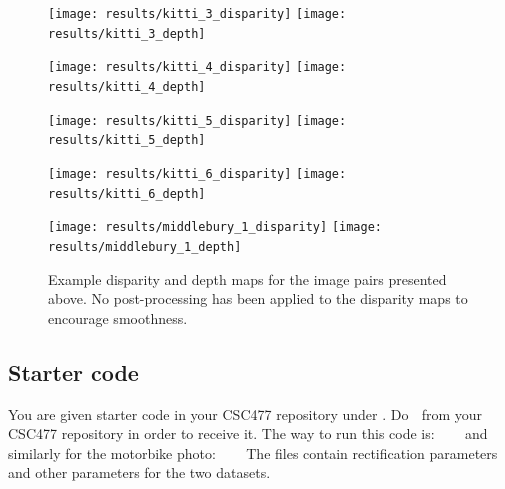 \documentclass[11pt, a4paper]{article}
\begin{document}
\begin{figure}[h!]
  \begin{center}
    \texttt{[image: results/kitti\_3\_disparity]}
    \texttt{[image: results/kitti\_3\_depth]}
  \end{center}
\end{figure}

\begin{figure}[h!]
  \begin{center}
    \texttt{[image: results/kitti\_4\_disparity]}
    \texttt{[image: results/kitti\_4\_depth]}
  \end{center}
\end{figure}

\begin{figure}[h!]
  \begin{center}
    \texttt{[image: results/kitti\_5\_disparity]}
    \texttt{[image: results/kitti\_5\_depth]}
  \end{center}
\end{figure}

\begin{figure}[h!]
  \begin{center}
    \texttt{[image: results/kitti\_6\_disparity]}
    \texttt{[image: results/kitti\_6\_depth]}
  \end{center}
\end{figure}

\begin{figure}[h!]
  \begin{center}
    \texttt{[image: results/middlebury\_1\_disparity]}
    \texttt{[image: results/middlebury\_1\_depth]}
  \end{center} 
  \caption{Example disparity and depth maps for the image pairs presented above. No post-processing has been applied to the disparity maps to encourage smoothness.}
  \label{fig:results}
\end{figure}
\subsection*{Starter code}
\noindent You are given starter code in your CSC477 repository under . Do  $\;$  
from your CSC477 repository in order to receive it. The way to run this code is:
\newline
\newline
{} $\;$  $\;$  $\;$ 
\newline
\newline
\noindent and similarly for the motorbike photo:
 $\;$  $\;$  $\;$ 
\newline
\newline
\noindent The  files contain rectification parameters and other parameters for the two datasets.
\end{document}
